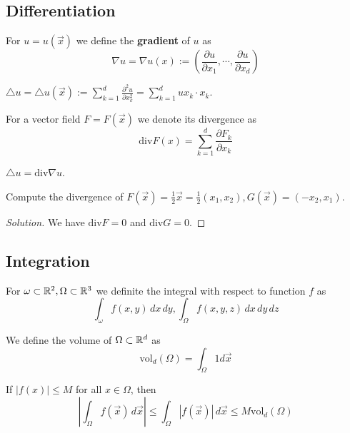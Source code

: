 \subsection{Differentiation}
\begin{definition}
	For $u = u(\vec x)$ we define the \textbf{gradient} of $u$ as
	\[ \nabla u = \nabla u(x) := \left( \frac{\partial u}{\partial x_1}, \cdots, \frac{\partial u}{\partial x_d} \right) \]
\end{definition}
\begin{definition}
 $\triangle u = \triangle u(\vec x) := \sum_{k=1}^{d} \frac{\partial^2 u}{\partial x^2_k} = \sum_{k=1}^{d} u x_k \cdot x_k$.
\end{definition}
\begin{definition}
	For a vector field $F = F(\vec x)$ we denote its divergence as
	\[ \mathrm{div} F(x) = \sum_{k=1}^{d} \frac{\partial F_k}{\partial x_k}\] 
\end{definition}
\begin{remark}
	$\triangle u = \mathrm{div} \nabla u$.
\end{remark}
\begin{exercise}
	Compute the divergence of $F(\vec x) = \frac 12 \vec x = \frac 12(x_1, x_2), G(\vec x) = (-x_2, x_1)$.
\end{exercise}
\begin{proof}[Solution]
	We have $\mathrm{div}F = 0$ and $\mathrm{div} G = 0$.
\end{proof}
\subsection{Integration}
\begin{definition}
	For $\omega \subset \mathbb R^2, \Omega \subset \mathbb R^3$ we definite the integral with respect to function $f$ as
	\[ \int_\omega f(x,y) \,dx\,dy, \int_{\Omega} f(x,y,z)\, dx\,dy\,dz\]
\end{definition}
\begin{definition}
	We define the volume of $\Omega \subset \mathbb R^d$ as
	\[ \mathrm{vol}_d(\Omega) = \int_\Omega 1 d\vec x \]
\end{definition}
\begin{remark}
	If $|f(x)| \leq M$ for all $x \in \Omega$, then
	\[ \left|\int_\Omega f(\vec x) \,d \vec x \right|\leq \int_\Omega |f(\vec x)|\,d\vec x \leq M \mathrm{vol}_d(\Omega)\]
\end{remark}
